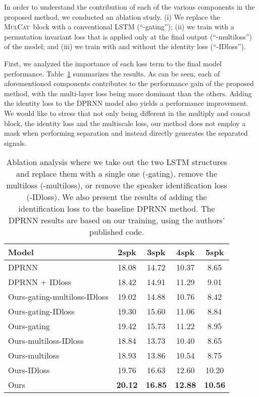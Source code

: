 \documentclass{article}
\newcommand{\ours}{\textsc{MulCat}~}
\begin{document}
In order to understand the contribution of each of the various components in the proposed method, we conducted an ablation study. (i) We replace the \ours block with a conventional LSTM (``-gating''); (ii) we train with a permutation invariant loss that is applied only at the final output (``-multiloss'') of the model; and (iii) we train with and without the identity loss (``-IDloss''). 

First, we analyzed the importance of each loss term to the final model performance. Table~\ref{tab:ablation} summarizes the results. As can be seen, each of aforementioned components contributes to the performance gain of the proposed method, with the multi-layer loss being more dominant than the others. Adding the identity loss to the DPRNN model also yields a performance improvement. We would like to stress that not only being different in the multiply and concat block, the identity loss and the multiscale loss, our method does not employ a mask when performing separation and instead directly generates the separated signals.

\begin{table}[t]
    \centering
    \caption{Ablation analysis where we take out the two LSTM structures and replace them with a single one (-gating), remove the multiloss (-multiloss), or remove the speaker identification loss (-IDloss). We also present the results of adding the identification loss to the baseline DPRNN method. The DPRNN results are based on our training, using the authors' published code.}
    \label{tab:ablation}
    \begin{tabular}{@{}l@{~}c@{~~}c@{~~}c@{~~}c@{}}
    \toprule
Model&	2spk&	3spk&	4spk&	5spk\\
\midrule
DPRNN&	18.08 &	14.72&	10.37&	8.65\\
DPRNN + IDloss& 18.42 &	14.91&	11.29&	9.01\\
Ours-gating-multiloss-IDloss&	19.02&	14.88&	10.76&	8.42\\
Ours-gating-IDloss&	19.30&	15.60&	11.06&	8.84\\
Ours-gating		  &	19.42&	15.73&	11.22&	8.95\\
Ours-multiloss-IDloss&	18.84&	13.73&	10.40&	8.65\\
Ours-multiloss		 &	18.93&	13.86&	10.54&	8.75\\
Ours-IDloss&	19.76&	16.63&	12.60&	10.20\\
Ours&	\bf 20.12&	\bf 16.85&	\bf 12.88&	\bf 10.56\\
\bottomrule
\end{tabular}
\end{table}
\end{document}
